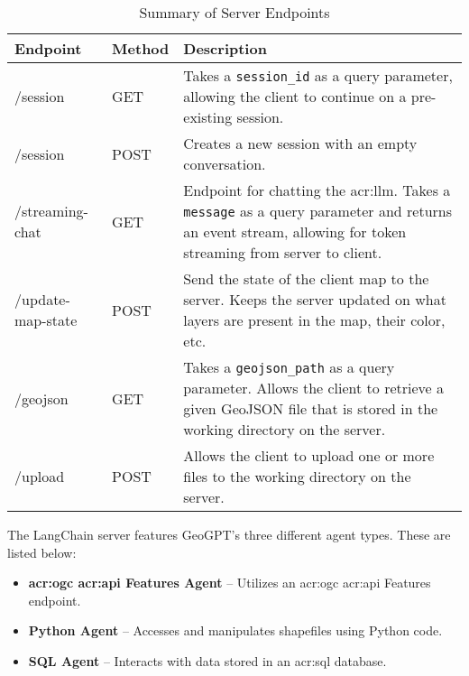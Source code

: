 \begin{table}[H]
    \centering
    \caption{Summary of Server Endpoints}
    \label{tbl:server-endpoints}
    \begin{tabular}{p{}p{}p{}}
        \toprule
        \textbf{Endpoint} & \textbf{Method} & \textbf{Description}                                                                                                                                                         \\
        \midrule
        /session          & GET             & Takes a \texttt{session\_id} as a query parameter, allowing the client to continue on a pre-existing session.                                                                \\
        /session          & POST            & Creates a new session with an empty conversation.                                                                                                                            \\
        /streaming-chat   & GET             & Endpoint for chatting the \acrshort{acr:llm}. Takes a \texttt{message} as a query parameter and returns an event stream, allowing for token streaming from server to client. \\
        /update-map-state & POST            & Send the state of the client map to the server. Keeps the server updated on what layers are present in the map, their color, etc.                                            \\
        /geojson          & GET             & Takes a \texttt{geojson\_path} as a query parameter. Allows the client to retrieve a given GeoJSON file that is stored in the working directory on the server.               \\
        /upload           & POST            & Allows the client to upload one or more files to the working directory on the server.                                                                                        \\
        \bottomrule
    \end{tabular}
\end{table}

The LangChain server features GeoGPT's three different agent types. These are listed below:

\begin{itemize}
    \item \textbf{\acrshort{acr:ogc} \acrshort{acr:api} Features Agent} -- Utilizes an \acrshort{acr:ogc} \acrshort{acr:api} Features endpoint.
    \item \textbf{Python Agent} -- Accesses and manipulates shapefiles using Python code.
    \item \textbf{SQL Agent} -- Interacts with data stored in an \acrshort{acr:sql} database.
\end{itemize}

